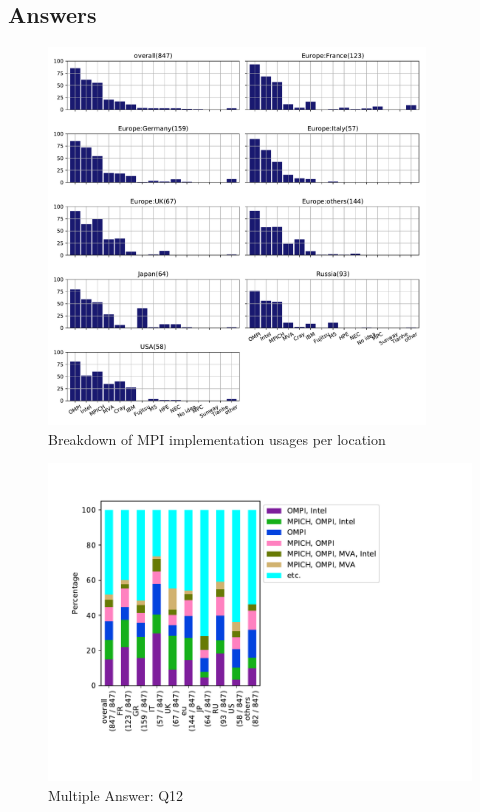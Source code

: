 
\subsection{Answers}


\begin{figure}[htb]
\begin{center}
\includegraphics[width=10cm]{../pdfs/Q12.pdf}
\caption{Breakdown of MPI implementation usages per location}
\label{fig:Q12}
\end{center}
\end{figure}

\begin{figure}[htb]
\begin{center}
\includegraphics[width=14cm]{../pdfs/Q12-mans.pdf}
\caption{Multiple Answer: Q12}
\label{fig:Q12-mans}
\end{center}
\end{figure}

